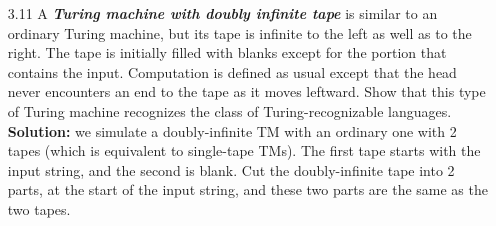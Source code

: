 \begin{enumerate}
\item[3.11] A \emph{\textbf{Turing machine with doubly infinite tape}} is similar to an ordinary Turing machine, but its tape is infinite to the left as well as to the right. The tape is initially filled with blanks except for the portion that contains the input. Computation is defined as usual except that the head never encounters an end to the tape as it moves leftward. Show that this type of Turing machine recognizes the class of Turing-recognizable languages.
\\
\textbf{Solution:} we simulate a doubly-infinite TM with an ordinary one with 2 tapes (which is equivalent to single-tape TMs). The first tape starts with the input string, and the second is blank. Cut the doubly-infinite tape into 2 parts, at the start of the input string, and these two parts are the same as the two tapes.


\end{enumerate}
